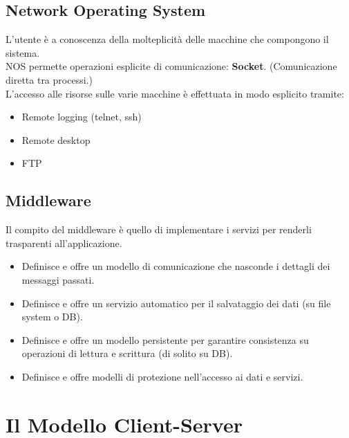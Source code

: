 \documentclass[12pt, a4paper]{article}
\begin{document}
    \subsection*{Network Operating System}
    L'utente è a conoscenza della molteplicità delle macchine che compongono il sistema.
    \\NOS permette operazioni esplicite di comunicazione: \textbf{Socket}.
    (Comunicazione diretta tra processi.)
    \\L'accesso alle risorse sulle varie macchine è effettuata in modo esplicito tramite:
    \begin{itemize}
        \item Remote logging (telnet, ssh)
        \item Remote desktop
        \item FTP
    \end{itemize}
    \subsection*{Middleware}
    Il compito del middleware è quello di implementare i servizi per renderli trasparenti all'applicazione.
    \begin{itemize}
        \item Definisce e offre un modello di comunicazione che nasconde i dettagli dei messaggi passati.
        \item Definisce e offre un servizio automatico per il salvataggio dei dati (su file system o DB).
        \item Definisce e offre un modello persistente per garantire consistenza su operazioni di lettura e scrittura (di solito su DB).
        \item Definisce e offre modelli di protezione nell'accesso ai dati e servizi.
    \end{itemize}
    \newpage
    \section{Il Modello Client-Server}
\end{document}
